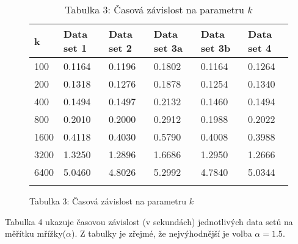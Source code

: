 \documentclass[
12pt,
a4paper,
pdftex,
czech,
titlepage
]{report}
\begin{document}
\begin{figure}[htp]
\centering
\begin{longtable}[]{@{}llllll@{}}
\toprule
k & Data set 1 & Data set 2 & Data set 3a & Data set 3b & Data set 4 \\
\midrule
\endhead
100 & 0.1164 & 0.1196 & 0.1802 & 0.1164 & 0.1264 \\
200 & 0.1318 & 0.1276 & 0.1878 & 0.1254 & 0.1340 \\
400 & 0.1494 & 0.1497 & 0.2132 & 0.1460 & 0.1494 \\
800 & 0.2010 & 0.2000 & 0.2912 & 0.1988 & 0.2022 \\
1600 & 0.4118 & 0.4030 & 0.5790 & 0.4008 & 0.3988 \\
3200 & 1.3250 & 1.2896 & 1.6686 & 1.2950 & 1.2666 \\
6400 & 5.0460 & 4.8026 & 5.2992 & 4.7840 & 5.0344 \\
\bottomrule
\captionsetup{labelformat=empty}
\caption{Tabulka 3: Časová závislost na parametru \(k\) \cite{base}}
\end{longtable}
\end{figure}

Tabulka 4 ukazuje časovou závislost (v sekundách) jednotlivých data setů
na měřítku mřížky(\(\alpha\)). Z tabulky je zřejmé, že nejvýhodnější je
volba \(\alpha=1.5\).
\end{document}
